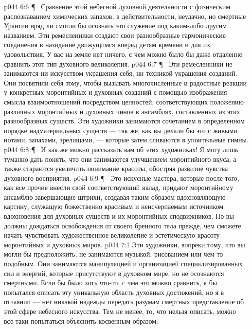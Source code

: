 \vs p044 6:6 \P\ \bibnobreakspace {} Сравнение этой небесной духовной деятельности с физическим распознаванием химических запахов, в действительности, неудачно, но смертные Урантии вряд ли смогли бы осознать это служение под каким\hyp{}либо другим названием. Эти ремесленники создают свои разнообразные гармонические соединения в назидание движущимся вперед детям времени и для их удовольствия. У вас на земле нет ничего, с чем можно было бы даже отдаленно сравнить этот тип духовного великолепия.
\vs p044 6:7 \P\ \bibnobreakspace {} Эти ремесленники не занимаются ни искусством украшения себя, ни техникой украшения созданий. Они посвятили себя тому, чтобы вызывать многочисленные и радостные реакции у конкретных моронтийных и духовных созданий с помощью изображения смысла взаимоотношений посредством ценностей, соответствующих положению различных моронтийных и духовных чинов в ансамблях, составленных из этих разнообразных существ. Эти художники занимаются сочетанием в определенном порядке надматериальных существ --- так же, как вы делали бы это с живыми нотами, запахами, зрелищами, --- которые затем сливаются в упоительные гимны.
\vs p044 6:8 \P\ \bibnobreakspace {} И как же можно рассказать вам об этих художниках! Я могу лишь туманно дать понять, что они занимаются улучшением моронтийного вкуса, а также стараются увеличить понимание красоты, обостряя развитие чувства духовного восприятия.
\vs p044 6:9 \P\ \bibnobreakspace {} Это искусные мастера, которые после того, как все прочие внесли свой соответствующий вклад, придают моронтийному ансамблю завершающие штрихи, создавая таким образом вдохновляющую картину, служащую божественно красивым и неисчерпаемым источником вдохновения для духовных существ и их моронтийных сподвижников. Но вы должны дождаться освобождения от своего бренного тела прежде, чем сможете начать чувствовать художественное великолепие и эстетическую красоту моронтийных и духовных миров.
\vs p044 7:1 Эти художники, вопреки тому, что вы могли бы предположить, не занимаются музыкой, рисованием или чем\hyp{}то подобным. Они занимаются манипуляцией и организацией специализированных сил и энергий, которые присутствуют в духовном мире, но не осознаются смертными. Если бы было хоть что\hyp{}то, с чем это можно сравнить, я бы попытался описать эту уникальную область духовных достижений, но я в отчаянии --- нет никакой надежды передать разумам смертных представление об этой сфере небесного искусства. Тем не менее, то, что нельзя описать, можно все\hyp{}таки попытаться объяснить косвенным образом:
